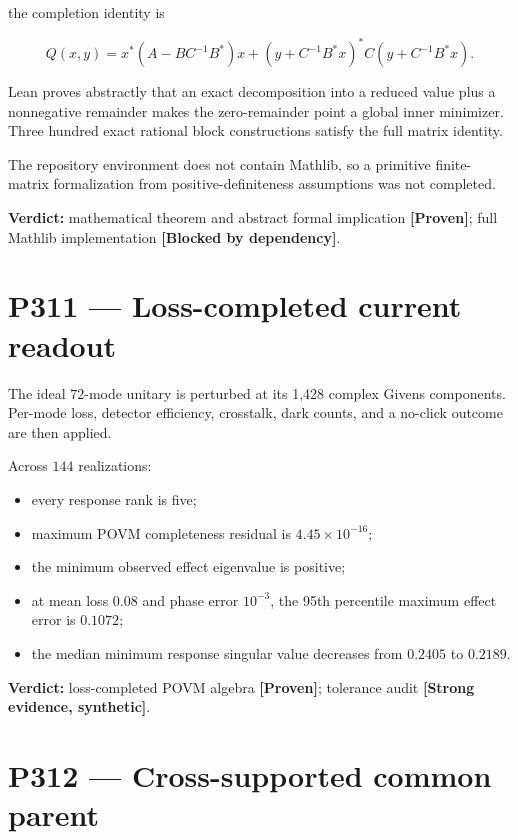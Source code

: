 \documentclass[11pt,a4paper,openany]{report}
\newcommand{\statusProven}{\textcolor{fingreen}{[Proven]}}
\begin{document}
the completion identity is

\[
Q(x,y)
=
x^\ast(A-BC^{-1}B^\ast)x
+(y+C^{-1}B^\ast x)^\ast
C(y+C^{-1}B^\ast x).
\]

Lean proves abstractly that an exact decomposition into a reduced value plus a nonnegative remainder makes the zero-remainder point a global inner minimizer. Three hundred exact rational block constructions satisfy the full matrix identity.

The repository environment does not contain Mathlib, so a primitive finite-matrix formalization from positive-definiteness assumptions was not completed.

\textbf{Verdict:} mathematical theorem and abstract formal implication \textbf{\statusProven{}}; full Mathlib implementation \textbf{[Blocked by dependency]}.

\section{P311 --- Loss-completed current readout}

The ideal \(72\)-mode unitary is perturbed at its 1,428 complex Givens components. Per-mode loss, detector efficiency, crosstalk, dark counts, and a no-click outcome are then applied.

Across \(144\) realizations:

\begin{itemize}
\item 
every response rank is five;

\item 
maximum POVM completeness residual is \(4.45\times10^{-16}\);

\item 
the minimum observed effect eigenvalue is positive;

\item 
at mean loss \(0.08\) and phase error \(10^{-3}\), the 95th percentile maximum effect error is \(0.1072\);

\item 
the median minimum response singular value decreases from \(0.2405\) to \(0.2189\).

\end{itemize}

\textbf{Verdict:} loss-completed POVM algebra \textbf{\statusProven{}}; tolerance audit \textbf{[Strong evidence, synthetic]}.

\section{P312 --- Cross-supported common parent}
\end{document}
